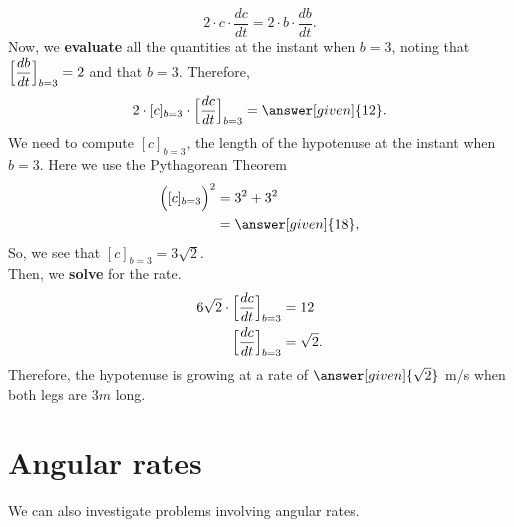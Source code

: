 \documentclass{ximera}
\begin{document}
\begin{example}
\begin{explanation}
       \[
    2\cdot c\cdot\dfrac{dc}{dt} = 2\cdot b\cdot\dfrac{db}{dt}.
    \]
    Now, we \textbf{evaluate} all the quantities at the instant when $b=3$, noting that
    $\Bigl[\dfrac{db}{dt}\Bigr]_{b=3} = 2$ and that $b = 3$. Therefore,
    \[
    2\cdot [c]_{b=3}\cdot \Bigl[\dfrac{dc}{dt}\Bigr]_{b=3} = \answer[given]{12}.
    \]
    We need to compute $[c]_{b=3}$, the length of the hypotenuse at the instant when $b=3$. Here we use
    the Pythagorean Theorem
    \begin{align*}
    \Bigl([c]_{b=3}\Bigr)^2 &= 3^2 + 3^2\\
    &=\answer[given]{18},
    \end{align*}
    So, we see that $[c]_{b=3} = 3\sqrt{2}$. \\
    Then, we \textbf{solve} for the rate.\\
    \begin{align*}
      6\sqrt{2}\cdot \Bigl[\dfrac{dc}{dt}\Bigr]_{b=3} &= 12 \\     
      \Bigl[\dfrac{dc}{dt}\Bigr]_{b=3} &= \sqrt{2}.
    \end{align*}
    Therefore, the hypotenuse  is growing at a rate of $\answer[given]{\sqrt{2}}$ m/s when both legs are $3m$ long.
  \end{explanation}
\end{example}


\section{Angular rates}


We can also investigate problems involving angular rates.
\end{document}
